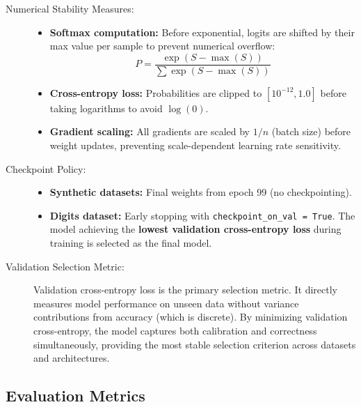 \documentclass[sigconf,screen,nonacm]{acmart}
\begin{document}
\begin{description}
    \item[Numerical Stability Measures:] \hfill
    \begin{itemize}
        \item \textbf{Softmax computation:} Before exponential, logits are shifted by their max value per sample to prevent numerical overflow:
        \[
        P = \frac{\exp(S - \max(S))}{\sum \exp(S - \max(S))}
        \]
        \item \textbf{Cross-entropy loss:} Probabilities are clipped to $[10^{-12}, 1.0]$ before taking logarithms to avoid $\log(0)$.
        \item \textbf{Gradient scaling:} All gradients are scaled by $1/n$ (batch size) before weight updates, preventing scale-dependent learning rate sensitivity.
    \end{itemize}

    \item[Checkpoint Policy:] \hfill
    \begin{itemize}
        \item \textbf{Synthetic datasets:} Final weights from epoch 99 (no checkpointing).
        \item \textbf{Digits dataset:} Early stopping with \texttt{checkpoint\_on\_val = True}. The model achieving the \textbf{lowest validation cross-entropy loss} during training is selected as the final model.
    \end{itemize}

    \item[Validation Selection Metric:] Validation cross-entropy loss is the primary selection metric. It directly measures model performance on unseen data without variance contributions from accuracy (which is discrete). By minimizing validation cross-entropy, the model captures both calibration and correctness simultaneously, providing the most stable selection criterion across datasets and architectures.
\end{description}

\subsection{Evaluation Metrics}
\end{document}
